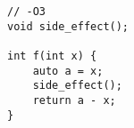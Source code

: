 \begin{lstlisting}[title=\href{https://godbolt.org/z/8zATSp}{\texttt{godbolt.org/z/8zATSp}}]
// -O3
void side_effect();

int f(int x) {
    auto a = x;
    side_effect();
    return a - x;
}
\end{lstlisting}
